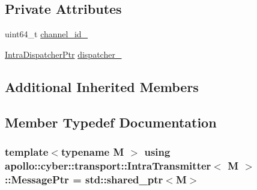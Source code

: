 \subsection*{Private Attributes}
\begin{DoxyCompactItemize}
\item 
uint64\-\_\-t \hyperlink{classapollo_1_1cyber_1_1transport_1_1IntraTransmitter_ae0d14adfb5f776a9698b3d6e5f883216}{channel\-\_\-id\-\_\-}
\item 
\hyperlink{namespaceapollo_1_1cyber_1_1transport_af059bf179d7ece8cb6ee52f0157568de}{Intra\-Dispatcher\-Ptr} \hyperlink{classapollo_1_1cyber_1_1transport_1_1IntraTransmitter_a8290039108f635c0de7cf37ae7c8b966}{dispatcher\-\_\-}
\end{DoxyCompactItemize}
\subsection*{Additional Inherited Members}


\subsection{Member Typedef Documentation}
\hypertarget{classapollo_1_1cyber_1_1transport_1_1IntraTransmitter_ae47240b6bbe5421bb9d2e4b87d2ff98e}{
\subsubsection[{Message\-Ptr}]{\setlength{\rightskip}{0pt plus 5cm}template$<$typename M $>$ using {\bf apollo\-::cyber\-::transport\-::\-Intra\-Transmitter}$<$ M $>$\-::{\bf Message\-Ptr} =  std\-::shared\-\_\-ptr$<$M$>$}}\label{classapollo_1_1cyber_1_1transport_1_1IntraTransmitter_ae47240b6bbe5421bb9d2e4b87d2ff98e}


